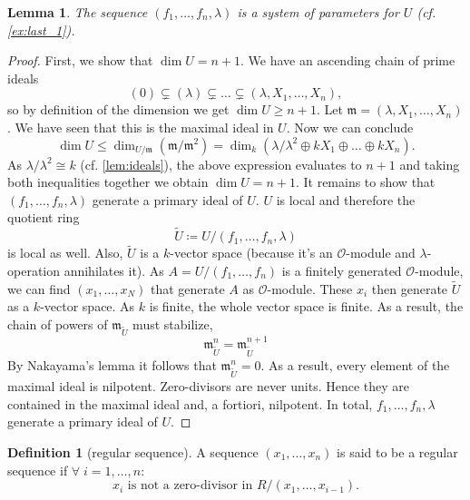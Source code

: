 \documentclass{article}
\theoremstyle{plain}%
\newtheorem{lemma}{Lemma}[section]
\theoremstyle{definition}
\newtheorem{definition}{Definition}[section]
\theoremstyle{remark}
\begin{document}
\begin{lemma}\label{lem:sys_params}\textup{\cite[lemma 5.10]{darmon1995fermat}}
    The sequence \((f_1, \dots, f_n, \lambda)\) is a system of parameters for \(U\) (cf. \cref{ex:last_1}).
\end{lemma}
\begin{proof}
    First, we show that \(\dim U = n + 1\).
    We have an ascending chain of prime ideals
    \[
        (0) \subsetneq (\lambda) \subsetneq \dots \subsetneq (\lambda, X_1, \dots, X_n),  
    \]
    so by definition of the dimension we get \(\dim U \geq n + 1\).
    Let \(\mathfrak{m} = (\lambda, X_1, \dots, X_n)\). We have seen that this is the maximal ideal in \(U\).
    Now we can conclude
    \[
        \dim U \leq \dim_{U/\mathfrak{m}}(\mathfrak{m}/\mathfrak{m}^2) 
        = \dim_k(\lambda/\lambda^2 \oplus k X_1 \oplus \dots \oplus k X_n).
    \]
    As \(\lambda/\lambda^2 \cong k\) (cf. \cref{lem:ideals}), the above expression evaluates to \(n+1\) and
    taking both inequalities together we obtain \(\dim U = n + 1\).
    It remains to show that \((f_1, \dots, f_n, \lambda)\) generate a primary ideal of \(U\).
    \(U\) is local and therefore the quotient ring 
    \[\tilde{U} \coloneqq U/(f_1, \dots, f_n, \lambda)\] 
    is local as well.
    Also, \(\tilde U\) is a \(k\)-vector space (because it's an \(\mathcal{O}\)-module and \(\lambda\)-operation
    annihilates it). As \(A = U/(f_1, \dots, f_n)\) is a finitely generated \(\mathcal{O}\)-module, we can find
    \((x_1, \dots, x_N)\) that generate \(A\) as \(\mathcal{O}\)-module.
    These \(x_i\) then generate \(\tilde U\) as a \(k\)-vector space.
    As \(k\) is finite, the whole vector space is finite.
    As a result, the chain of powers of \(\mathfrak{m}_{\tilde U}\) must stabilize,
    \[
        \mathfrak{m}_{\tilde U}^n = \mathfrak{m}_{\tilde U}^{n+1}
    \]
    By Nakayama's lemma it follows that \(\mathfrak{m}_{\tilde U}^n = 0\).
    As a result, every element of the maximal ideal is nilpotent.
    Zero-divisors are never units. Hence they are contained in the maximal ideal and, a fortiori, nilpotent.
    In total, \(f_1, \dots, f_n, \lambda\) generate a primary ideal of \(U\).
\end{proof}

\begin{definition}[regular sequence]\cite[cf.][\S 16]{Matsumura1986}
    A sequence \((x_1, \dots, x_n)\) is said to be a regular sequence 
    if \(\forall\; i = 1, \dots, n\colon\)
    \[x_i \text{ is not a zero-divisor in } R/(x_1, \dots, x_{i-1}).\]
\end{definition}
\end{document}
